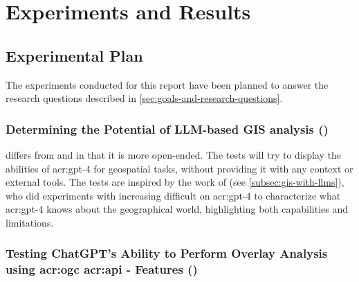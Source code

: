 \chapter{Experiments and Results}
\label{cha:experiments}

\section{Experimental Plan}
\label{sec:experimentalPlan}

\begin{comment}
Trying and failing is a major part of research. However, to have a chance of success you need a plan driving the experimental research, just as you need a plan for your literature search. Further, plans are made to be revised, and this revision ensures that any further decisions made are in line with the work already completed.

The plan should include what experiments or series of experiments are planned and what questions the individual or set of experiments aim to answer. Such questions should be connected to your research questions, so that in the evaluation of your results you can discuss the results wrt to the research questions.
\end{comment}

The experiments conducted for this report have been planned to answer the research questions described in \autoref{sec:goals-and-research-questions}.

\subsection[Determining the Potential of LLM-based GIS analysis (RQ 1)]{Determining the Potential of LLM-based GIS analysis ()}

 differs from  and  in that it is more open-ended. The tests will try to display the abilities of \acrshort{acr:gpt}-4 for geospatial tasks, without providing it with any context or external tools. The tests are inspired by the work of \cite{robertsGPT4GEOHowLanguage2023} (see \autoref{subsec:gis-with-llms}), who did experiments with increasing difficult on \acrshort{acr:gpt}-4 to characterize what \acrshort{acr:gpt}-4 knows about the geographical world, highlighting both capabilities and limitations.

\subsection[Testing ChatGPT's Ability to Perform Overlay Analysis using OGC API - Features (RQ 2)]{Testing ChatGPT's Ability to Perform Overlay Analysis using \acrshort{acr:ogc} \acrshort{acr:api} - Features ()}

